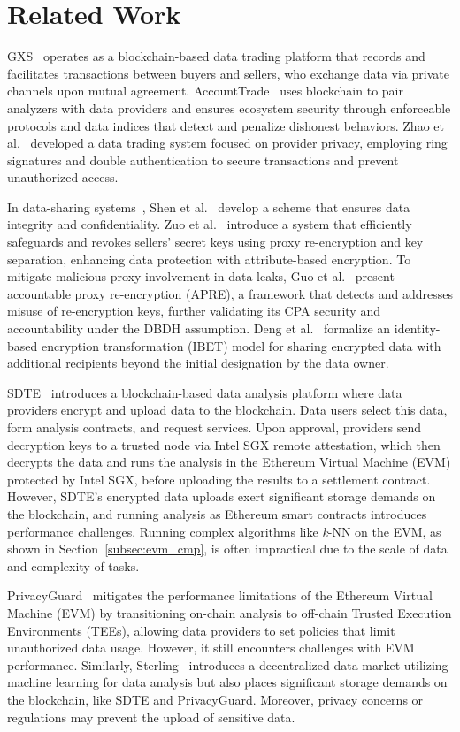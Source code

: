 \section{Related Work}\label{sec:related}
GXS~\cite{gxchain} operates as a blockchain-based data trading platform that records and facilitates transactions between buyers and sellers, who exchange data via private channels upon mutual agreement.
AccountTrade~\cite{accounttrade} uses blockchain to pair analyzers with data providers and ensures ecosystem security through enforceable protocols and data indices that detect and penalize dishonest behaviors.
Zhao et al.~\cite{zhao} developed a data trading system focused on provider privacy, employing ring signatures and double authentication to secure transactions and prevent unauthorized access.


In data-sharing systems~\cite{dong2015secure,yue2017big,xia2017medshare}, Shen et al.~\cite{shen} develop a scheme that ensures data integrity and confidentiality.
Zuo et al.~\cite{FG} introduce a system that efficiently safeguards and revokes sellers' secret keys using proxy re-encryption and key separation, enhancing data protection with attribute-based encryption.
To mitigate malicious proxy involvement in data leaks, Guo et al.~\cite{APRE} present accountable proxy re-encryption (APRE), a framework that detects and addresses misuse of re-encryption keys, further validating its CPA security and accountability under the DBDH assumption.
Deng et al.~\cite{IBET} formalize an identity-based encryption transformation (IBET) model for sharing encrypted data with additional recipients beyond the initial designation by the data owner.


SDTE~\cite{dai2019sdte} introduces a blockchain-based data analysis platform where data providers encrypt and upload data to the blockchain. Data users select this data, form analysis contracts, and request services. Upon approval, providers send decryption keys to a trusted node via Intel SGX remote attestation, which then decrypts the data and runs the analysis in the Ethereum Virtual Machine (EVM) protected by Intel SGX, before uploading the results to a settlement contract.
However, SDTE's encrypted data uploads exert significant storage demands on the blockchain, and running analysis as Ethereum smart contracts introduces performance challenges. Running complex algorithms like \textit{k}-NN on the EVM, as shown in Section~\ref{subsec:evm_cmp}, is often impractical due to the scale of data and complexity of tasks.


PrivacyGuard~\cite{xiao2020privacyguard} mitigates the performance limitations of the Ethereum Virtual Machine (EVM) by transitioning on-chain analysis to off-chain Trusted Execution Environments (TEEs), allowing data providers to set policies that limit unauthorized data usage. However, it still encounters challenges with EVM performance. Similarly, Sterling~\cite{hynes2018demonstration} introduces a decentralized data market utilizing machine learning for data analysis but also places significant storage demands on the blockchain, like SDTE and PrivacyGuard. Moreover, privacy concerns or regulations may prevent the upload of sensitive data.